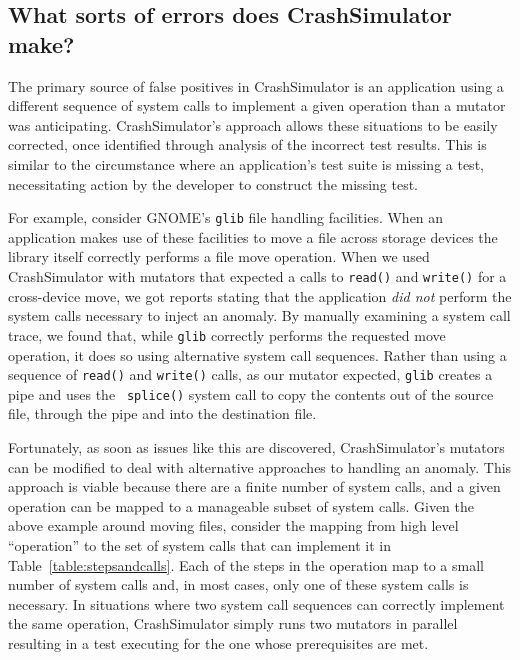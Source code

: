 \subsection{What sorts of errors does CrashSimulator make?}
\label{sec-sorts-errors}

The primary source of false positives in CrashSimulator is an application
using a different sequence of system calls to implement a given operation
than a mutator was anticipating. CrashSimulator's approach allows these
situations to be easily corrected, once identified through analysis of the
incorrect test results.  This is similar to the circumstance where an
application's test suite is missing a test, necessitating action by the
developer to construct the missing test.

For example, consider GNOME's {\tt glib} file handling facilities.  When an
application makes use of these facilities to move a file across storage
devices the library itself correctly performs a
file move operation.  When we used CrashSimulator with
mutators that expected a calls to {\tt read()} and {\tt write()}
for a cross-device move, we got reports stating that the
application {\em did not} perform the system calls necessary to inject
an anomaly.  By manually
examining a system call trace, we found that, while {\tt glib} correctly
performs the requested move operation,
it does so using alternative system call
sequences.  Rather than using a sequence of {\tt read()} and {\tt write()}
calls, as our mutator expected, {\tt glib} creates a pipe and uses the {\tt
splice()} system call to copy the contents out of the source file, through
the pipe and into the destination file.

Fortunately, as soon as issues like this are discovered,
CrashSimulator's mutators can be modified to deal with alternative
approaches to handling an anomaly.  This approach is viable because there
are a finite number of system calls, and a given operation can be mapped to
a manageable subset of system calls.  Given the above example around moving
files, consider the mapping from high level ``operation'' to the set of
system calls that can implement it in Table~\ref{table:stepsandcalls}.
Each of the steps in the operation map to a small number of system calls
and, in most cases, only one of these system calls is necessary.  In
situations where two system call sequences can correctly implement the same
operation, CrashSimulator simply runs two mutators in parallel resulting in a
test executing for the one whose prerequisites are met.

